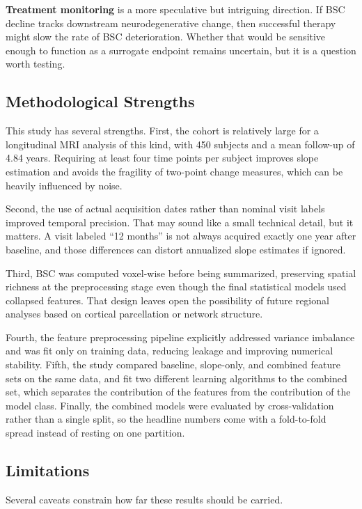 \documentclass[blue]{ludusofficial}  %
\begin{document}
\textbf{Treatment monitoring} is a more speculative but intriguing direction. If BSC decline tracks downstream neurodegenerative change, then successful therapy might slow the rate of BSC deterioration. Whether that would be sensitive enough to function as a surrogate endpoint remains uncertain, but it is a question worth testing.

\subsection{Methodological Strengths}

This study has several strengths. First, the cohort is relatively large for a longitudinal MRI analysis of this kind, with 450 subjects and a mean follow-up of 4.84 years. Requiring at least four time points per subject improves slope estimation and avoids the fragility of two-point change measures, which can be heavily influenced by noise.

Second, the use of actual acquisition dates rather than nominal visit labels improved temporal precision. That may sound like a small technical detail, but it matters. A visit labeled ``12 months'' is not always acquired exactly one year after baseline, and those differences can distort annualized slope estimates if ignored.

Third, BSC was computed voxel-wise before being summarized, preserving spatial richness at the preprocessing stage even though the final statistical models used collapsed features. That design leaves open the possibility of future regional analyses based on cortical parcellation or network structure.

Fourth, the feature preprocessing pipeline explicitly addressed variance imbalance and was fit only on training data, reducing leakage and improving numerical stability. Fifth, the study compared baseline, slope-only, and combined feature sets on the same data, and fit two different learning algorithms to the combined set, which separates the contribution of the features from the contribution of the model class. Finally, the combined models were evaluated by cross-validation rather than a single split, so the headline numbers come with a fold-to-fold spread instead of resting on one partition.

\subsection{Limitations}

Several caveats constrain how far these results should be carried.
\end{document}
